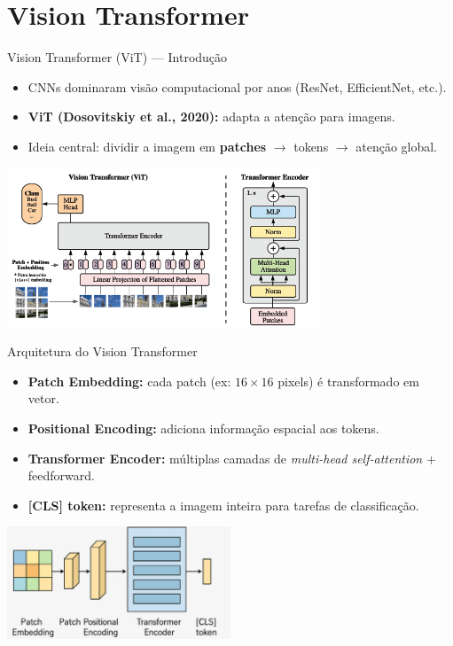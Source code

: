 \documentclass{beamer}
\begin{document}
\section{Vision Transformer}
\begin{frame}{Vision Transformer (ViT) — Introdução}
	\begin{itemize}
		\item CNNs dominaram visão computacional por anos (ResNet, EfficientNet, etc.).
		\item \textbf{ViT (Dosovitskiy et al., 2020):} adapta a atenção para imagens.
		\item Ideia central: dividir a imagem em \textbf{patches} $\rightarrow$ tokens $\rightarrow$ atenção global.
	\end{itemize}
\vspace{0.3cm}
	\begin{center}
		\includegraphics[width=0.7\textwidth]{assets/vit_pipeline.png} %
	\end{center}
\end{frame}

\begin{frame}{Arquitetura do Vision Transformer}
	\begin{itemize}
		\item \textbf{Patch Embedding:} cada patch (ex: $16\times16$ pixels) é transformado em vetor.
		\item \textbf{Positional Encoding:} adiciona informação espacial aos tokens.
		\item \textbf{Transformer Encoder:} múltiplas camadas de \textit{multi-head self-attention} + feedforward.
		\item \textbf{[CLS] token:} representa a imagem inteira para tarefas de classificação.
	\end{itemize}
\vspace{0.1cm}
	\begin{center}
	    \includegraphics[width=0.5\textwidth]{assets/vit_architecture.png}
	\end{center}
\end{frame}
\end{document}
